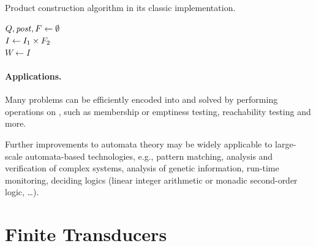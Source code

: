 \begin{algorithm}[ht]
\caption{Product construction algorithm in its classic implementation.}\label{productConstructionAlg}
\DontPrintSemicolon
{}
\BlankLine
$Q, \mathit{post}, F \gets \emptyset$ \\
$I \gets I_1 \times F_2$ \\
$W \gets  I$

\end{algorithm}

\paragraph{Applications.}
Many problems can be efficiently encoded into \nfas and solved by performing operations on \nfas, such as membership or emptiness testing, reachability testing and more.


Further improvements to automata theory may be widely applicable to large-scale automata-based technologies, e.g., pattern matching, analysis and verification of complex systems, analysis of genetic information, run-time monitoring, deciding logics (linear integer arithmetic or monadic second-order logic, \ldots).

\section{Finite Transducers}

